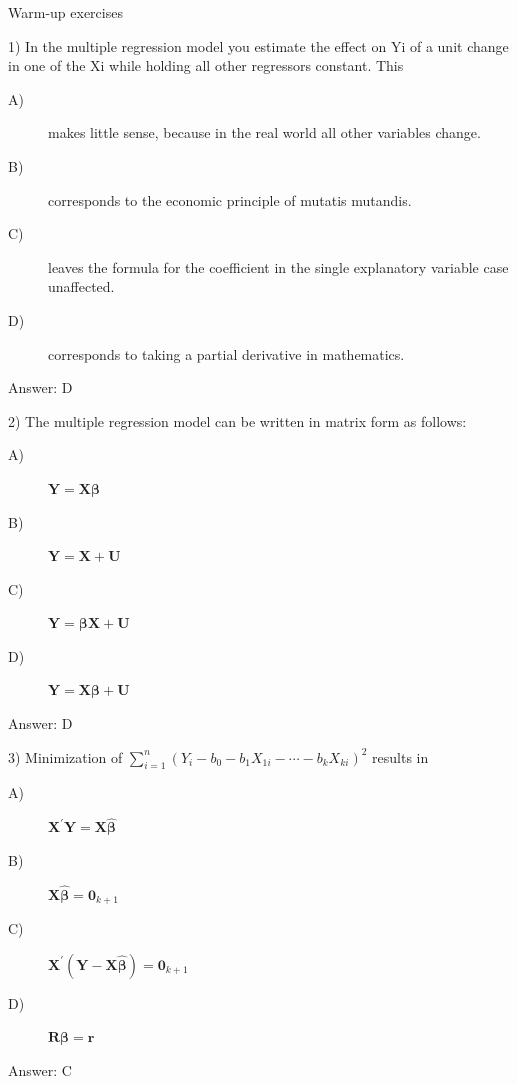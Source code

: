 \documentclass[presentation,10pt]{beamer}
\begin{document}
\begin{frame}[shrink,label={sec:org45b57cb}]{Warm-up exercises}
\begin{block}{1) In the multiple regression model you estimate the effect on Yi of a unit change in one of the Xi while holding all other regressors constant. This}
\begin{description}
\item[{A)}] makes little sense, because in the real world all other variables change.
\item[{B)}] corresponds to the economic principle of mutatis mutandis.
\item[{C)}] leaves the formula for the coefficient in the single explanatory variable case unaffected.
\item[{D)}] corresponds to taking a partial derivative in mathematics.
\end{description}
\pause
Answer:  D
\end{block}

\begin{block}{2) The multiple regression model can be written in matrix form as follows:}
\begin{description}
\item[{A)}] \(\mathbf{Y} = \mathbf{X} \boldsymbol{\beta}\)
\item[{B)}] \(\mathbf{Y} = \mathbf{X} + \mathbf{U}\)
\item[{C)}] \(\mathbf{Y} = \boldsymbol{\beta} \mathbf{X} + \mathbf{U}\)
\item[{D)}] \(\mathbf{Y} = \mathbf{X} \boldsymbol{\beta} + \mathbf{U}\)
\end{description}
\pause
Answer:  D
\end{block}

\begin{block}{3) Minimization of \(\sum_{i=1}^n (Y_i - b_0 - b_1 X_{1i} - \cdots - b_k X_{ki})^2\) results in}
\begin{description}
\item[{A)}] \(\mathbf{X}^{\prime}\mathbf{Y} = \mathbf{X} \hat{\boldsymbol{\beta}}\)
\item[{B)}] \(\mathbf{X} \hat{\boldsymbol{\beta}} = \mathbf{0}_{k+1}\)
\item[{C)}] \(\mathbf{X}^{\prime} (\mathbf{Y} - \mathbf{X} \hat{\boldsymbol{\beta}}) = \mathbf{0}_{k+1}\)
\item[{D)}] \(\mathbf{R} \boldsymbol{\beta} = \mathbf{r}\)
\end{description}
\pause
Answer:  C
\end{block}
\end{frame}
\end{document}
